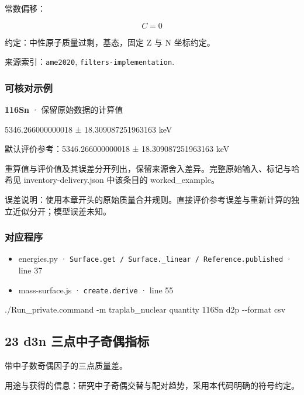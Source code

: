 \documentclass[
  11pt,
  letterpaper,
]{article}
\newenvironment{Shaded}{}{}
\newcommand{\AttributeTok}[1]{\textcolor[rgb]{0.49,0.56,0.16}{#1}}
\newcommand{\ExtensionTok}[1]{#1}
\newcommand{\NormalTok}[1]{#1}
\providecommand{\tightlist}{%
  \setlength{\itemsep}{0pt}\setlength{\parskip}{0pt}}
\begin{document}
常数偏移：

\[
C=0
\]

约定：中性原子质量过剩，基态，固定 Z 与 N 坐标约定。

来源索引：\texttt{ame2020}, \texttt{filters-implementation}.

\subsubsection{可核对示例}\label{ux53efux6838ux5bf9ux793aux4f8b-21}

\textbf{116Sn} · 保留原始数据的计算值

5346.266000000018 ± 18.309087251963163 keV

默认评价参考：5346.266000000018 ± 18.309087251963163 keV

重算值与评价值及其误差分开列出，保留来源舍入差异。完整原始输入、标记与哈希见
inventory-delivery.json 中该条目的 worked\_example。

误差说明：使用本章开头的原始质量合并规则。直接评价参考误差与重新计算的独立近似分开；模型误差未知。

\subsubsection{对应程序}\label{ux5bf9ux5e94ux7a0bux5e8f-21}

\begin{itemize}
\tightlist
\item
  energies.py ·
  \texttt{Surface.get\ /\ Surface.\_linear\ /\ Reference.published} ·
  line 37
\item
  mass-surface.js · \texttt{create.derive} · line 55
\end{itemize}

\begin{Shaded}
\begin{Highlighting}[]
\ExtensionTok{./Run\_private.command} \AttributeTok{{-}m}\NormalTok{ traplab\_nuclear quantity 116Sn d2p }\AttributeTok{{-}{-}format}\NormalTok{ csv}
\end{Highlighting}
\end{Shaded}

\subsection{23 d3n
三点中子奇偶指标}\label{d3n-ux4e09ux70b9ux4e2dux5b50ux5947ux5076ux6307ux6807}

带中子数奇偶因子的三点质量差。

用途与获得的信息：研究中子奇偶交替与配对趋势，采用本代码明确的符号约定。
\end{document}
